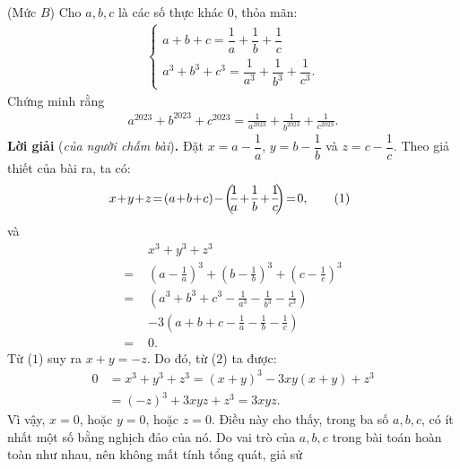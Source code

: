 \begin{multicols}{2}
	(Mức $B$)
	Cho $a, b, c$ là các số thực khác $0$, thỏa mãn:
	\begin{align*}
		\begin{cases}
			a + b + c = \dfrac{1}{a} + \dfrac{1}{b} + \dfrac{1}{c}\\
			{a^3} + {b^3} + {c^3} = \dfrac{1}{{{a^3}}} + \dfrac{1}{{{b^3}}} + \dfrac{1}{{{c^3}}}.
		\end{cases}
	\end{align*}
	Chứng minh rằng
	\begin{align*}
		{a^{2023}} \!+\! {b^{2023}} \!+\! {c^{2023}} \!=\! \frac{1}{{{a^{2023}}}} \!+\! \frac{1}{{{b^{2023}}}} \!+\! \frac{1}{{{c^{2023}}}}.
	\end{align*}
	\textbf{\color{thachthuctoanhoc}Lời giải} (\textit{của người chấm bài})\textbf{\color{thachthuctoanhoc}.}
	\vskip 0.05cm
	Đặt $x = a - \dfrac{1}{a}$, $y = b - \dfrac{1}{b}$  và $z = c - \dfrac{1}{c}$.
	\vskip 0.05cm
	Theo giả thiết của bài ra, ta có:
	\begin{align*}
		\hspace*{-5pt}x \!+\! y \!+\! z \!=\! \left( {a \!+\! b \!+\! c} \right) \!-\! \left(\!\! {\frac{1}{a} \!+\! \frac{1}{b} \!+\! \frac{1}{c}} \!\!\right) \!=\! 0, \tag{$1$}
	\end{align*}
	và
	\begin{align*}
		&{x^3} + {y^3} + {z^3} \\
		= \,&{\left( {a - \frac{1}{a}} \right)^3} + {\left( {b - \frac{1}{b}} \right)^3} + {\left( {c - \frac{1}{c}} \right)^3}\\
		= \,&\left( {{a^3} + {b^3} + {c^3} - \frac{1}{{{a^3}}} - \frac{1}{{{b^3}}} - \frac{1}{{{c^3}}}} \right) \\
		&- 3\left( {a + b + c - \frac{1}{a} - \frac{1}{b} - \frac{1}{c}} \right)\\
		 = \,\,& 0.\tag{$2$}
	\end{align*}
	Từ ($1$) suy ra $x + y = -z$. Do đó, từ ($2$) ta được:
	\begin{align*}
		0 &= {x^3} \!+\! {y^3} \!+\! {z^3} = {\left( {x \!+\! y} \right)^3} \!-\! 3xy\left( {x \!+\! y} \right) \!+\! {z^3} \\
		&= {\left( { - z} \right)^3} + 3xyz + {z^3} = 3xyz.
	\end{align*}
	Vì vậy, $x = 0$, hoặc $y = 0$, hoặc $z = 0$. Điều này cho thấy, trong ba số $a, b, c$, có ít nhất một số bằng nghịch đảo của nó.
	\vskip 0.05cm
	Do vai trò của $a, b, c$ trong bài toán hoàn toàn như nhau, nên không mất tính tổng quát, giả sử
	\begin{align*}

\end{align*}
\end{multicols}
